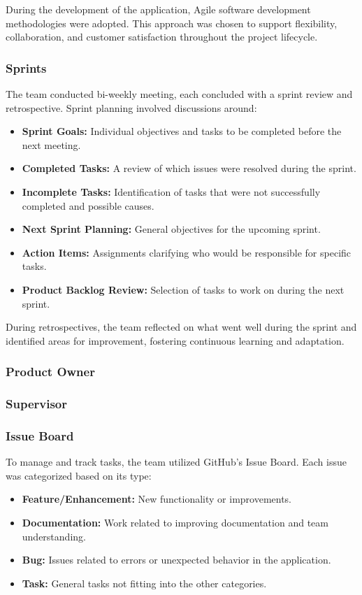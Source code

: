 During the development of the application, Agile software development methodologies were adopted. This approach was chosen to support flexibility, collaboration, and customer satisfaction throughout the project lifecycle.

\subsubsection*{Sprints}

The team conducted bi-weekly meeting, each concluded with a sprint review and retrospective. Sprint planning involved discussions around:

\begin{itemize}
  \item \textbf{Sprint Goals:} Individual objectives and tasks to be completed before the next meeting.
  \item \textbf{Completed Tasks:} A review of which issues were resolved during the sprint.
  \item \textbf{Incomplete Tasks:} Identification of tasks that were not successfully completed and possible causes.
  \item \textbf{Next Sprint Planning:} General objectives for the upcoming sprint.
  \item \textbf{Action Items:} Assignments clarifying who would be responsible for specific tasks.
  \item \textbf{Product Backlog Review:} Selection of tasks to work on during the next sprint.
\end{itemize}

During retrospectives, the team reflected on what went well during the sprint and identified areas for improvement, fostering continuous learning and adaptation.

\subsubsection*{Product Owner}

\subsubsection*{Supervisor}

\subsubsection*{Issue Board}

To manage and track tasks, the team utilized GitHub’s Issue Board. Each issue was categorized based on its type:
\begin{itemize}
  \item \textbf{Feature/Enhancement:} New functionality or improvements.
  \item \textbf{Documentation:} Work related to improving documentation and team understanding.
  \item \textbf{Bug:} Issues related to errors or unexpected behavior in the application.
  \item \textbf{Task:} General tasks not fitting into the other categories.
\end{itemize}


